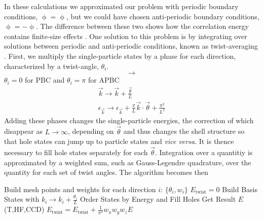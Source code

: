\documentclass[thesis.tex]{subfiles}
\begin{document}
In these calculations we
approximated our problem with periodic boundary conditions,
  $\mathop{\phi(x_{i})}=\mathop{\phi(x_{i}+L)}$, but we could have
  chosen anti-periodic boundary conditions,
  $\mathop{\phi(x_{i})}=-\mathop{\phi(x_{i}+L)}$. The difference
  between these two shows how the correlation energy contains
  finite-size effects \cite{gros1992,gros1996,shepherd2012,shepherd2016}. One solution to this problem is by integrating
  over solutions between periodic and anti-periodic conditions, known
  as twist-averaging \cite{twistaverage}. First, we multiply the single-particle states by
  a phase for each direction, characterized by a twist-angle,
  $\theta_{i}$.
  \begin{equation}
    \mathop{\phi_{\vec{k}}(\vec{x}+\vec{L})}\rightarrow\mathop{e^{i\vec{\theta}}\phi_{\vec{k}}(\vec{x})}
  \end{equation}
  $\theta_{i}=0$ for PBC and $\theta_{i}=\pi$ for APBC
  \begin{align}
  \vec{k}\rightarrow\vec{k}+\frac{\vec{\theta}}{L}
  \\ \epsilon_{\vec{k}}\rightarrow\epsilon_{\vec{k}}+\frac{\pi}{L}\vec{k}\cdot\vec{\theta}+\frac{\pi^{2}}{L^{2}}
  \end{align}
  Adding these phases changes the single-particle energies, the
  correction of which disappear as $L\rightarrow\infty$, depending on
  $\vec{\theta}$ and thus changes the shell structure so that hole
  states can jump up to particle states and {\em vice versa}. It is thence
  necessary to fill hole states separately for each
  $\vec{\theta}$. Integration over a quantitiy is approximated by a
  weighted sum, such as Gauss-Legendre quadrature, over the quantity
  for each set of twist angles. The algorithm becomes then
\begin{svgraybox}
  \begin{algorithmic}
    \State Build mesh points and weights for each direction $i$:
    $\{\theta_{i},w_{i}\}$ \State $E_{\text{twist}}=0$
    \State Build Basis States with $k_{i}\rightarrow
    k_{i}+\frac{\theta_{i}}{L}$ \State Order States by Energy and Fill
    Holes \State Get Result $E$ (T,HF,CCD) \State
    $E_{\text{twist}}=E_{\text{twist}}+\frac{1}{\pi^{3}}w_{x}w_{y}w_{z}E$
    \EndFor \EndFor \EndFor
  \end{algorithmic}
\end{svgraybox}
\end{document}
